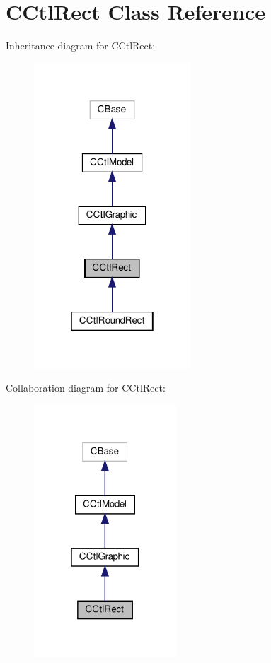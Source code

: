 \hypertarget{classCCtlRect}{}\section{C\+Ctl\+Rect Class Reference}
\label{classCCtlRect}


Inheritance diagram for C\+Ctl\+Rect\+:
\nopagebreak
\begin{figure}[H]
\begin{center}
\leavevmode
\includegraphics[width=166pt]{classCCtlRect__inherit__graph}
\end{center}
\end{figure}


Collaboration diagram for C\+Ctl\+Rect\+:
\nopagebreak
\begin{figure}[H]
\begin{center}
\leavevmode
\includegraphics[width=151pt]{classCCtlRect__coll__graph}
\end{center}
\end{figure}
